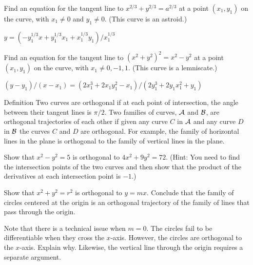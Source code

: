 \begin{exercises}
\begin{exercise} Find an equation for the tangent line to $x^{2/3} +
y^{2/3} = a^{2/3}$ at a point $(x_1 ,y_1)$ on the curve, 
with $x_1 \neq 0$ and $y_1 \neq 0$. (This curve is an {\dfont astroid}.)
\begin{answer} $y=(-y_1^{1/3}x+y_1^{1/3}x_1+x_1^{1/3}y_1)/x_1^{1/3}$
\end{answer}\end{exercise}

\begin{exercise} Find an equation for the tangent line to $(x^2 +y^2 )^2 =x^2
-y^2$ at a point $(x_1 , y_1)$ on the curve, with $x_1 \neq 0, -1, 1$.
(This curve is a {\dfont lemniscate}.)
\begin{answer} $(y-y_1)/(x-x_1)=(2x_1^3+2x_1y_1^2-x_1)/(2y_1^3+2y_1x_1^2+y_1)$
\end{answer}\end{exercise}

\begin{remark}{Definition}
Two curves are {\dfont orthogonal\/} if at each point of intersection,
the angle between their tangent lines is $\pi/2$. Two
families of curves, $\cal{A}$ and $\cal{B}$, are
{\dfont orthogonal trajectories} of each other if given any curve $C$
in $\cal{A}$ and any curve $D$ in $\cal{B}$ the curves $C$
and $D$ are orthogonal.
For example, the family of horizontal lines in the plane is
orthogonal to the family of vertical lines in the plane.
\end{remark}

 \begin{exercise} Show that $x^2 -y^2 =5$ is orthogonal to $4x^2 +9y^2
 =72$. (Hint: You need to find the intersection points of the two
 curves and then show that the product of the derivatives at each
 intersection point is $-1$.)
\end{exercise}

\begin{exercise} Show that $x^2 +y^2 = r^2$ is orthogonal to
$y=mx$. Conclude that the family of circles centered at the origin is
an orthogonal trajectory of the family of lines that pass through the
origin.

Note that there is a technical issue when $m=0$. The circles fail to
be differentiable when they cross the $x$-axis. However, the circles
are orthogonal to the $x$-axis. Explain why. Likewise, the vertical
line through the origin requires a separate argument.
\end{exercise}


\end{exercises}
